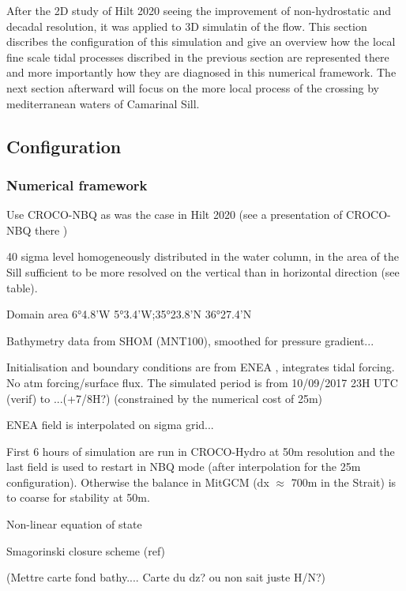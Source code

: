 After the 2D study of Hilt 2020 seeing the improvement of non-hydrostatic and decadal resolution, it was applied to 3D simulatin of the flow. This section discribes the configuration of this simulation and give an overview how the local fine scale tidal processes discribed in the previous section are represented there and more importantly how they are diagnosed in this numerical framework. The next section afterward will focus on the more local process of the crossing by mediterranean waters of Camarinal Sill.



\subsection{Configuration}
\subsubsection{Numerical framework}

Use CROCO-NBQ as was the case in Hilt 2020 (see a presentation of CROCO-NBQ there ) 

40 sigma level homogeneously distributed in the water column, in the area of the Sill sufficient to be more resolved on the vertical than in horizontal direction (see table).

Domain area 6°4.8'W  5°3.4'W;35°23.8'N  36°27.4'N 

Bathymetry data from SHOM (MNT100), smoothed for pressure gradient...

Initialisation and boundary conditions are from ENEA , integrates tidal forcing. No atm forcing/surface flux. The simulated period is from 10/09/2017 23H UTC (verif) to ...(+7/8H?) (constrained by the numerical cost of 25m)

ENEA field is interpolated on sigma grid...

First 6 hours of simulation are run in CROCO-Hydro at 50m resolution and the last field is used to restart in NBQ mode (after interpolation for the 25m configuration). Otherwise the balance in MitGCM (dx $\approx$ 700m in the Strait) is to coarse for stability at 50m.

Non-linear equation of state

Smagorinski closure scheme (ref)

(Mettre carte fond bathy.... Carte du dz? ou non sait juste H/N?)


